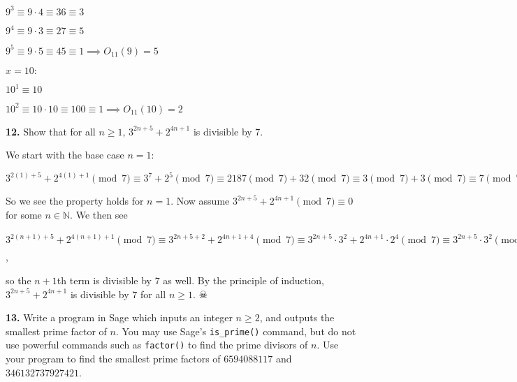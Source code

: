 \documentclass[12pt]{amsart}
\def\NN{{\mathbb N}}
\begin{document}
$9^3 \equiv 9\cdot 4 \equiv 36 \equiv 3$

$9^4 \equiv 9\cdot 3 \equiv 27 \equiv 5$

$9^5 \equiv 9\cdot 5 \equiv 45 \equiv 1 \implies O_{11}(9) = 5$

\medskip

$x=10:$

\smallskip

$10^1 \equiv 10$

$10^2 \equiv 10 \cdot 10 \equiv 100 \equiv 1 \implies O_{11}(10) = 2$

\bigskip

\bigskip

{\bf 12.} Show that for all $n\geq1$, $3^{2n+5}+2^{4n+1}$ is divisible by $7$.

\medskip

We start with the base case $n = 1$:

\smallskip

$3^{2(1)+5}+2^{4(1)+1}\pmod{7}\equiv 3^7+2^5\pmod{7}\equiv2187\pmod{7}+32\pmod{7}\equiv3\pmod{7}+3\pmod{7}\equiv 7\pmod{7}\equiv 0\pmod{7}$

\smallskip

So we see the property holds for $n = 1$. Now assume $3^{2n+5}+2^{4n+1}\pmod{7}\equiv 0$ for some $n\in\NN$. We then see

\smallskip

$ 3^{2(n+1)+5}+2^{4(n+1)+1}\pmod{7}\equiv 3^{2n+5+2}+2^{4n+1+4}\pmod{7}\equiv 3^{2n+5}\cdot 3^{2} + 2^{4n+1}\cdot 2^4\pmod{7}\equiv 3^{2n+5}\cdot 3^{2}\pmod{7} + 2^{4n+1}\cdot 2^4\pmod{7}\equiv 3^{2n+5}\cdot 9 \pmod{7} + 2^{4n+1}\cdot 16\pmod{7}\equiv 3^{2n+5}\cdot 2 \pmod{7} + 2^{4n+1}\cdot 2\pmod{7} \equiv 2\cdot(3^{2n+5} + 2^{4n+1})\pmod{7}\equiv 2\cdot 0\pmod{7}\equiv 0$,

\smallskip

so the $n+1$th term is divisible by $7$ as well. By the principle of induction, $3^{2n+5}+2^{4n+1}$ is divisible by $7$ for all $n\geq 1$. $\skull$ 

\medskip

\newpage

{\bf 13.}  Write a program in Sage which inputs an integer $n\geq2$, and outputs the smallest prime factor of $n$.  You may use Sage's {\tt is\_prime()} command, but do not use powerful commands such as {\tt factor()} to find the prime divisors of $n$.  Use your program to find the smallest prime factors of $6594088117$ and $346132737927421$.

\bigskip
\end{document}
